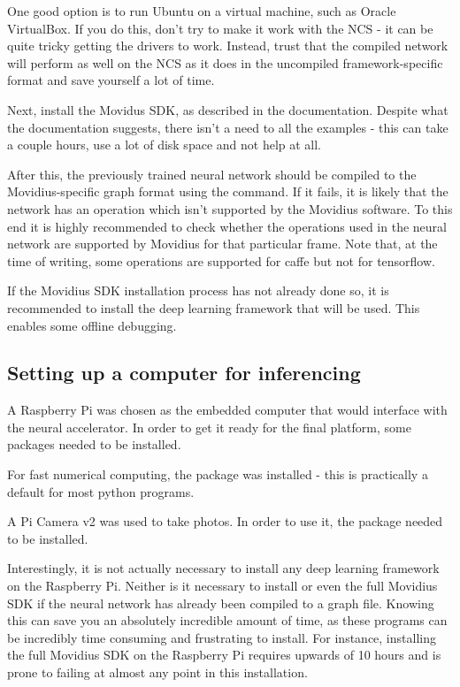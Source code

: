 One good option is to run Ubuntu on a virtual machine, such as Oracle VirtualBox. If you do this, don't try to make it work with the NCS - it can be quite tricky getting the drivers to work. Instead, trust that the compiled network will perform as well on the NCS as it does in the uncompiled framework-specific format and save yourself a lot of time.

Next, install the Movidus SDK, as described in the documentation. Despite what the documentation suggests, there isn't a need to  all the examples - this can take a couple hours, use a lot of disk space and not help at all.

After this, the previously trained neural network should be compiled to the Movidius-specific graph format using the  command. If it fails, it is likely that the network has an operation which isn't supported by the Movidius software. To this end it is highly recommended to check whether the operations used in the neural network are supported by Movidius for that particular frame. Note that, at the time of writing, some operations are supported for caffe but not for tensorflow.

If the Movidius SDK installation process has not already done so, it is recommended to install the deep learning framework that will be used. This enables some offline debugging.


\subsection{Setting up a computer for inferencing}
A Raspberry Pi was chosen as the embedded computer that would interface with the neural accelerator. In order to get it ready for the final platform, some packages needed to be installed.

For fast numerical computing, the  package was installed - this is practically a default for most python programs.

A Pi Camera v2 was used to take photos. In order to use it, the  package needed to be installed.

Interestingly, it is not actually necessary to install any deep learning framework on the Raspberry Pi. Neither is it necessary to install  or even the full Movidius SDK if the neural network has already been compiled to a graph file. Knowing this can save you an absolutely incredible amount of time, as these programs can be incredibly time consuming and frustrating to install. For instance, installing the full Movidius SDK on the Raspberry Pi requires upwards of 10 hours and is prone to failing at almost any point in this installation.

